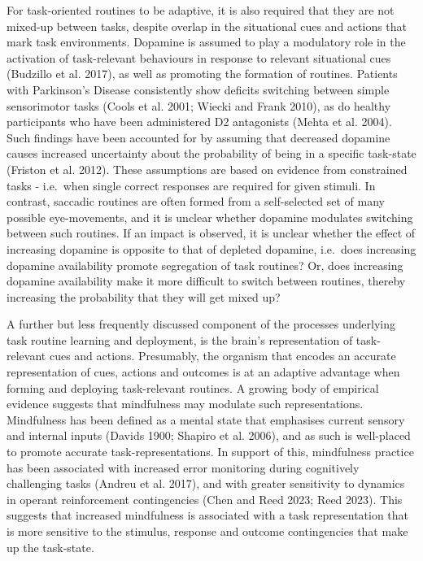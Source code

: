 \documentclass{article}
\begin{document}
For task-oriented routines to be adaptive, it is also required that they
are not mixed-up between tasks, despite overlap in the situational cues
and actions that mark task environments. Dopamine is assumed to play a
modulatory role in the activation of task-relevant behaviours in
response to relevant situational cues (Budzillo et al. 2017), as well as
promoting the formation of routines. Patients with Parkinson's Disease
consistently show deficits switching between simple sensorimotor tasks
(Cools et al. 2001; Wiecki and Frank 2010), as do healthy participants
who have been administered D2 antagonists (Mehta et al. 2004). Such
findings have been accounted for by assuming that decreased dopamine
causes increased uncertainty about the probability of being in a
specific task-state (Friston et al. 2012). These assumptions are based
on evidence from constrained tasks - i.e.~when single correct responses
are required for given stimuli. In contrast, saccadic routines are often
formed from a self-selected set of many possible eye-movements, and it
is unclear whether dopamine modulates switching between such routines.
If an impact is observed, it is unclear whether the effect of increasing
dopamine is opposite to that of depleted dopamine, i.e.~does increasing
dopamine availability promote segregation of task routines? Or, does
increasing dopamine availability make it more difficult to switch
between routines, thereby increasing the probability that they will get
mixed up?

A further but less frequently discussed component of the processes
underlying task routine learning and deployment, is the brain's
representation of task-relevant cues and actions. Presumably, the
organism that encodes an accurate representation of cues, actions and
outcomes is at an adaptive advantage when forming and deploying
task-relevant routines. A growing body of empirical evidence suggests
that mindfulness may modulate such representations. Mindfulness has been
defined as a mental state that emphasises current sensory and internal
inputs (Davids 1900; Shapiro et al. 2006), and as such is well-placed to
promote accurate task-representations. In support of this, mindfulness
practice has been associated with increased error monitoring during
cognitively challenging tasks (Andreu et al. 2017), and with greater
sensitivity to dynamics in operant reinforcement contingencies (Chen and
Reed 2023; Reed 2023). This suggests that increased mindfulness is
associated with a task representation that is more sensitive to the
stimulus, response and outcome contingencies that make up the
task-state.
\end{document}
